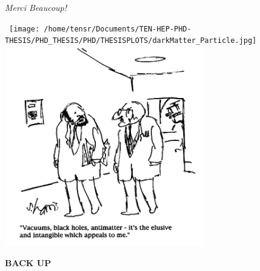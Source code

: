 \documentclass{beamer}
\begin{document}
{
\begin{frame}
 \begin{center}
   \textcolor{UMN@Maroon}{\Huge{\textsl{Merci Beaucoup!}} }
 \end{center}
 
 \begin{minipage}[b]{0.65\textwidth}
\mbox{
\texttt{[image: /home/tensr/Documents/TEN-HEP-PHD-THESIS/PHD\_THESIS/PHD/THESISPLOTS/darkMatter\_Particle.jpg]} \quad \quad
\includegraphics[height=0.65\textwidth,width=0.65\textwidth]{THESISPLOTS/New-Physics-PLOTS/ElusiveParticles.png}
}
 \end{minipage}
\end{frame}
}


{
\begin{frame}
  \begin{center}
   \textcolor{UMN@Maroon}{\Huge{\textbf{BACK UP}} }
  \end{center}
\end{frame}
}
\end{document}
